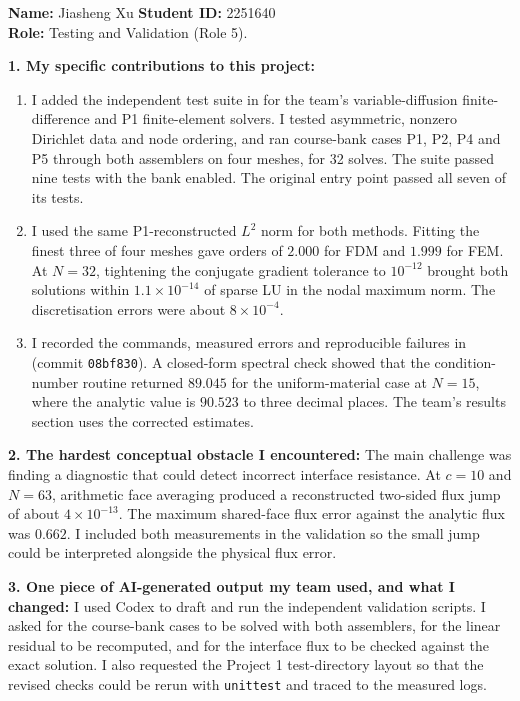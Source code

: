 \begin{formbox}
\textbf{Name:} Jiasheng Xu \hfill \textbf{Student ID:} 2251640\\
\textbf{Role:} Testing and Validation (Role 5).

\textbf{1. My specific contributions to this project:}
\begin{enumerate}[leftmargin=2em,itemsep=0.25em,topsep=0.15em]
    \item I added the independent test suite in
     for the team's variable-diffusion
    finite-difference and P1 finite-element solvers. I tested asymmetric,
    nonzero Dirichlet data and node ordering, and ran course-bank cases
    P1, P2, P4 and P5 through both assemblers on four meshes, for 32 solves.
    The suite passed nine tests with the bank enabled. The original
     entry point passed all seven of its tests.

    \item I used the same P1-reconstructed \(L^2\) norm for both methods.
    Fitting the finest three of four meshes gave orders of \(2.000\) for
    FDM and \(1.999\) for FEM. At \(N=32\), tightening the conjugate gradient
    tolerance to \(10^{-12}\) brought both solutions within
    \(1.1\times10^{-14}\) of sparse LU in the nodal maximum norm. The
    discretisation errors were about \(8\times10^{-4}\).

    \item I recorded the commands, measured errors and reproducible failures
    in 
    (commit \texttt{08bf830}). A closed-form spectral check showed that the
    condition-number routine returned \(89.045\) for the uniform-material
    case at \(N=15\), where the analytic value is \(90.523\) to three
    decimal places. The team's results section uses the corrected estimates.
\end{enumerate}

\textbf{2. The hardest conceptual obstacle I encountered:} The main challenge
was finding a diagnostic that could detect incorrect interface resistance.
At \(c=10\) and \(N=63\), arithmetic face averaging produced a reconstructed
two-sided flux jump of about \(4\times10^{-13}\). The maximum shared-face flux error against the
analytic flux was \(0.662\). I included both measurements in the validation
so the small jump could be interpreted alongside the physical flux error.

\textbf{3. One piece of AI-generated output my team used, and what I changed:}
I used Codex to draft and run the independent validation scripts. I asked
for the course-bank cases to be solved with both assemblers, for the linear
residual to be recomputed, and for the interface flux to be checked against
the exact solution. I also requested the Project 1 test-directory layout
so that the revised checks could be rerun with \texttt{unittest} and traced
to the measured logs.


\end{formbox}
